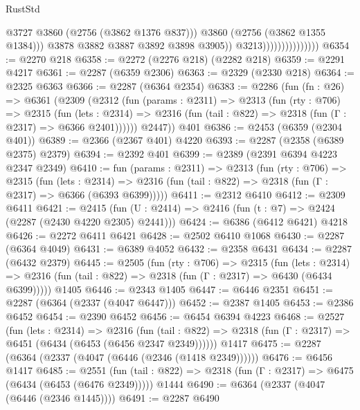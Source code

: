 \begin{lexlean}{RustStd}
\begin{coremodule}
                                          @3727
                                          @3860
                                          (@2756 (@3862 @1376 @837)))
                                        @3860
                                        (@2756 (@3862 @1355 @1384)))
                                      @3878
                                      @3882
                                      @3887
                                      @3892
                                      @3898
                                      @3905))
                                  @3213)))))))))))))))
@6354 := @2270 @218
@6358 := @2272 (@2276 @218) (@2282 @218)
@6359 := @2291 @4217
@6361 := @2287 (@6359 @2306)
@6363 := @2329 (@2330 @218)
@6364 := @2325 @6363
@6366 := @2287 (@6364 @2354)
@6383 := @2286
    (fun (fn : @26) =>
    @6361
      (@2309
        (@2312
          (fun (params : @2311) =>
          @2313
            (fun (rty : @706) =>
            @2315
              (fun (lets : @2314) =>
              @2316 (fun (tail : @822) => @2318 (fun (Γ : @2317) => @6366 @2401))))))
        @2447))
    @401
@6386 := @2453 (@6359 (@2304 @401))
@6389 := @2366 (@2367 @401) @4220
@6393 := @2287 (@2358 (@6389 @2375) @2379)
@6394 := @2392 @401
@6399 := @2389 (@2391 @6394 @4223 @2347 @2349)
@6410 := fun (params : @2311) =>
  @2313
    (fun (rty : @706) =>
    @2315
      (fun (lets : @2314) =>
      @2316 (fun (tail : @822) => @2318 (fun (Γ : @2317) => @6366 (@6393 @6399)))))
@6411 := @2312 @6410
@6412 := @2309 @6411
@6421 := @2415 (fun (U : @2414) => @2416 (fun (t : @7) => @2424 (@2287 (@2430 @4220 @2305) @2441)))
@6424 := @6386 (@6412 @6421) @4218
@6426 := @2272 @6411 @6421
@6428 := @2502 @6410 @1068
@6430 := @2287 (@6364 @4049)
@6431 := @6389 @4052
@6432 := @2358 @6431
@6434 := @2287 (@6432 @2379)
@6445 := @2505
    (fun (rty : @706) =>
    @2315
      (fun (lets : @2314) =>
      @2316 (fun (tail : @822) => @2318 (fun (Γ : @2317) => @6430 (@6434 @6399)))))
    @1405
@6446 := @2343 @1405
@6447 := @6446 @2351
@6451 := @2287 (@6364 (@2337 (@4047 @6447)))
@6452 := @2387 @1405
@6453 := @2386 @6452
@6454 := @2390 @6452
@6456 := @6454 @6394 @4223
@6468 := @2527
    (fun (lets : @2314) =>
    @2316
      (fun (tail : @822) => @2318 (fun (Γ : @2317) => @6451 (@6434 (@6453 (@6456 @2347 @2349))))))
    @1417
@6475 := @2287 (@6364 (@2337 (@4047 (@6446 (@2346 (@1418 @2349))))))
@6476 := @6456 @1417
@6485 := @2551
    (fun (tail : @822) => @2318 (fun (Γ : @2317) => @6475 (@6434 (@6453 (@6476 @2349)))))
    @1444
@6490 := @6364 (@2337 (@4047 (@6446 (@2346 @1445))))
@6491 := @2287 @6490

\end{coremodule}
\end{lexlean}
